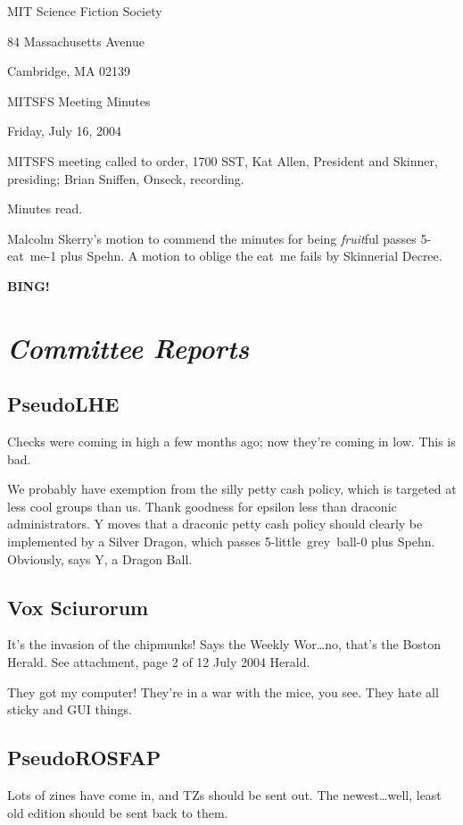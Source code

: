 \documentclass[10pt]{article}
\newcommand{\bing}{{\bf BING!} }
\newcommand{\goto}[1]{\bing \vskip 12pt \section*{{\em{#1}}}}
\newcommand{\ps}{ plus Spehn\xspace}
\begin{document}
\begin{center}

MIT Science Fiction Society 

84 Massachusetts Avenue

Cambridge, MA 02139

\vspace{12pt}

MITSFS Meeting Minutes 

Friday, July 16, 2004

\end{center}
 
\vspace{18pt}

\setlength{\parskip}{6pt}

\noindent
MITSFS meeting called to order, 1700 SST, Kat Allen, President and
Skinner, presiding; Brian Sniffen,  Onseck, recording.

Minutes read.

Malcolm Skerry's motion to commend the minutes for being
\emph{fruit}ful passes 5-eat~me-1\ps.  A motion to oblige the eat~me
fails by Skinnerial Decree.

\goto{Committee Reports}
\subsection*{PseudoLHE}
Checks were coming in high a few months ago; now they're coming in
low.  This is bad.

We probably have exemption from the silly petty cash policy, which is
targeted at less cool groups than us.  Thank goodness for epsilon less
than draconic administrators. Y moves that a draconic petty cash
policy should clearly be implemented by a Silver Dragon, which passes
5-little~grey~ball-0\ps.  Obviously, says Y, a Dragon Ball.

\subsection*{Vox Sciurorum}
It's the invasion of the chipmunks!  Says the Weekly Wor\dots no,
that's the Boston Herald.  See attachment, page 2 of 12 July 2004 Herald.

They got my computer!  They're in a war with the mice, you see.  They
hate all sticky and GUI things.

\subsection*{PseudoROSFAP}
Lots of zines have come in, and TZs should be sent out.  The
newest\dots well, least old edition should be sent back to them.
\end{document}
